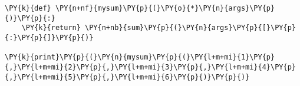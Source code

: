 \begin{Verbatim}[commandchars=\\\{\}]
\PY{k}{def} \PY{n+nf}{mysum}\PY{p}{(}\PY{o}{*}\PY{n}{args}\PY{p}{)}\PY{p}{:}
    \PY{k}{return} \PY{n+nb}{sum}\PY{p}{(}\PY{n}{args}\PY{p}{[}\PY{p}{:}\PY{p}{]}\PY{p}{)}

\PY{k}{print}\PY{p}{(}\PY{n}{mysum}\PY{p}{(}\PY{l+m+mi}{1}\PY{p}{,}\PY{l+m+mi}{2}\PY{p}{,}\PY{l+m+mi}{3}\PY{p}{,}\PY{l+m+mi}{4}\PY{p}{,}\PY{l+m+mi}{5}\PY{p}{,}\PY{l+m+mi}{6}\PY{p}{)}\PY{p}{)}
\end{Verbatim}
